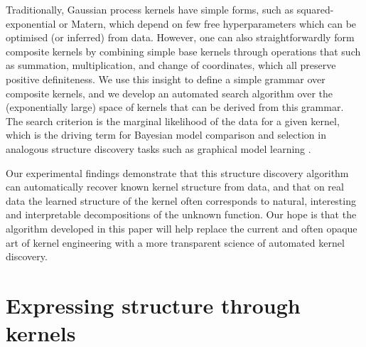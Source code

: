 \documentclass[twoside]{article}
\begin{document}
Traditionally, Gaussian process kernels have simple forms, such as squared-exponential or Matern, which depend on few free hyperparameters which can be optimised (or inferred) from data.
However, one can also straightforwardly form composite kernels by combining simple base kernels through operations that such as summation, multiplication, and change of coordinates, which all preserve positive definiteness.
We use this insight to define a simple grammar over composite kernels, and we develop an automated search algorithm over the (exponentially large) space of kernels that can be derived from this grammar.
The search criterion is the marginal likelihood of the data for a given kernel, which is the driving term for Bayesian model comparison and selection in analogous structure discovery tasks such as graphical model learning \cite{heckerman1995learning}. 


Our experimental findings demonstrate that this structure discovery algorithm can automatically recover known kernel structure from data, and that on real data the learned structure of the kernel often corresponds to natural, interesting and interpretable decompositions of the unknown function.
Our hope is that the algorithm developed in this paper will help replace the current and often opaque art of kernel engineering with a more transparent science of automated kernel discovery.


\section{Expressing structure through kernels}
\label{sec:Structure}
\end{document}
